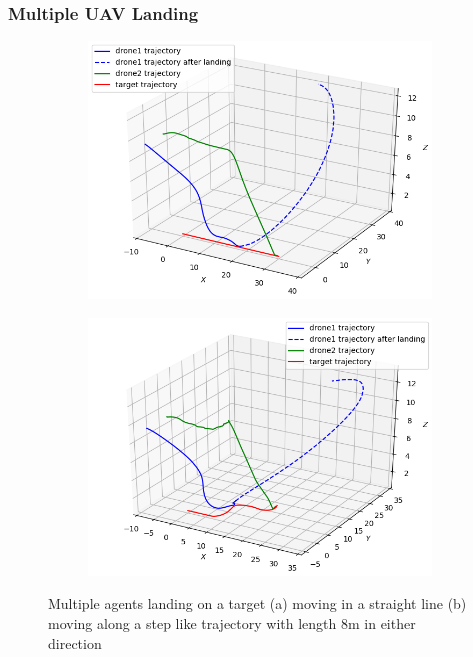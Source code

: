 \documentclass[conf]{new-aiaa}
\begin{document}
\subsubsection{Multiple UAV Landing}\label{sec:coop2_results}
\begin{figure}[H]
  \begin{subfigure}{0.5\textwidth}
    \includegraphics[width=\linewidth]{straight_multi.png}
    \caption{} \label{fig:straight_multi}
  \end{subfigure}%
  \hspace*{\fill}   %
  \begin{subfigure}{0.5\textwidth}
    \includegraphics[width=\linewidth]{step_multi.png}
    \caption{} \label{fig:step_multi}
  \end{subfigure}%
  \hspace*{\fill}   %
\caption{Multiple agents landing on a target (a) moving in a straight line (b) moving along a step like trajectory with length 8m in either direction} \label{fig:multiple}
\end{figure}
\end{document}

